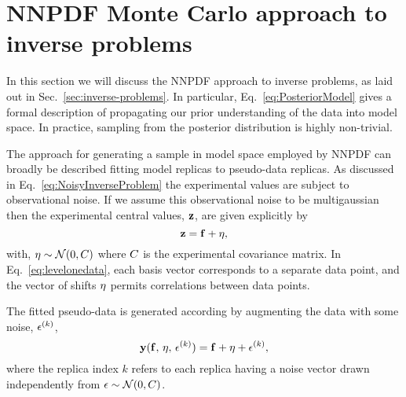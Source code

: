 \section{NNPDF Monte Carlo approach to inverse problems}

In this section we will discuss the NNPDF approach to inverse problems, as laid
out in Sec.~\ref{sec:inverse-problems}. In particular,
Eq.~\eqref{eq:PosteriorModel} gives a formal description of propagating our
prior understanding of the data into model space. In practice, sampling from
the posterior distribution is highly non-trivial.

The approach for generating
a sample in model space employed by NNPDF can broadly be described fitting model
replicas to pseudo-data replicas. As discussed in
Eq.~\eqref{eq:NoisyInverseProblem} the experimental values are subject to
observational noise. If we assume this observational noise
to be multigaussian then the experimental central values,
$\mathbf{z}$, are given explicitly by
\begin{equation}\label{eq:levelonedata}
    \mathbf{z} = \mathbf{f} + \mathbf{\eta},
\end{equation}
with, $\mathbf{\eta} \sim \mathcal{N}(0, C)$ where $C$ is the
experimental covariance matrix. In Eq.~\eqref{eq:levelonedata},
each basis vector corresponds to a separate data point, and the vector of
shifts $\mathbf{\eta}$ permits correlations between data points.

The fitted pseudo-data is generated according by
augmenting the data with some noise, $\epsilon^{(k)}$,
\begin{equation}\label{eq:leveltwodata1}
    \mathbf{y}(\mathbf{f},\,\mathbf{\eta},\,\mathbf{\epsilon}^{(k)})
    = \mathbf{f} + \mathbf{\eta} + \mathbf{\epsilon}^{(k)},
\end{equation}
where the replica index $k$ refers to each replica having a noise vector drawn
independently from $\mathbf{\epsilon} \sim \mathcal{N}(0, C)$.

